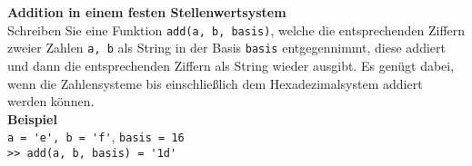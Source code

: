 \textbf{Addition in einem festen Stellenwertsystem}\\
Schreiben Sie eine Funktion \verb|add(a, b, basis)|, welche die entsprechenden Ziffern zweier Zahlen \verb|a, b| als String in der Basis \verb|basis| entgegennimmt, diese
addiert und dann die entsprechenden Ziffern als String wieder ausgibt. Es genügt dabei, wenn die Zahlensysteme bis einschließlich dem Hexadezimalsystem addiert werden können.\\

\textbf{Beispiel} \\
\verb|a = 'e', b = 'f'|, \verb|basis = 16| \\
\verb|>> add(a, b, basis) = '1d'|